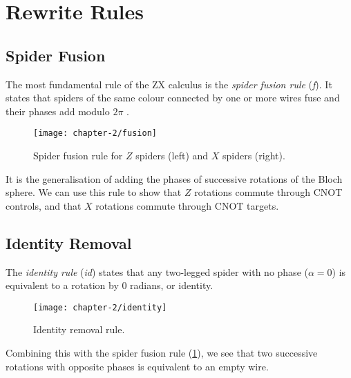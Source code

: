 \section{Rewrite Rules}%
\label{rewrite-rules}



\subsection{Spider Fusion}%
The most fundamental rule of the ZX calculus is the \textit{spider fusion rule} (\textit{f}). It states that spiders of the same colour connected by one or more wires fuse and their phases add modulo $2\pi$ \cite{Wetering2020}.

\begin{figure}[H]
    \centering
    \texttt{[image: chapter-2/fusion]}
    \caption{Spider fusion rule for $Z$ spiders (left) and $X$ spiders (right).}
    \label{spider-fusion}
\end{figure}

It is the generalisation of adding the phases of successive rotations of the Bloch sphere. We can use this rule to show that $Z$ rotations commute through CNOT controls, and that $X$ rotations commute through CNOT targets.



\subsection{Identity Removal}%

The \textit{identity rule} (\textit{id}) states that any two-legged spider with no phase ($\alpha = 0$) is equivalent to a rotation by 0 radians, or identity.

\begin{figure}[H]
    \centering
    \texttt{[image: chapter-2/identity]}
    \caption{Identity removal rule.}
    \label{identity}
\end{figure}

Combining this with the spider fusion rule (\ref{spider-fusion}), we see that two successive rotations with opposite phases is equivalent to an empty wire.

